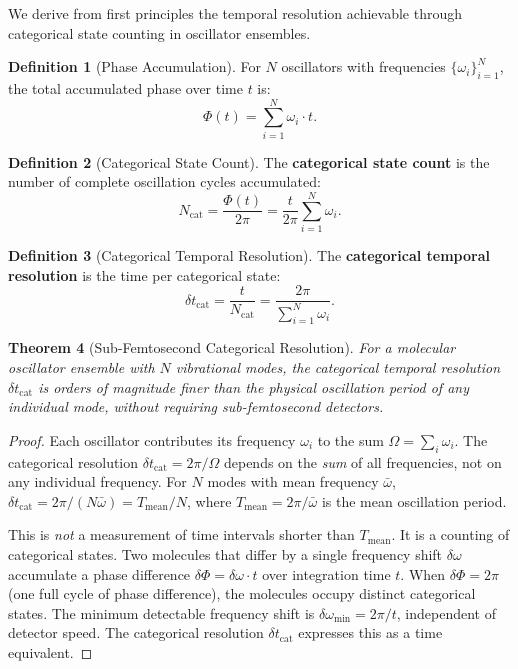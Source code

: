 \documentclass[11pt,a4paper]{article}
\newtheorem{theorem}{Theorem}[section]
\theoremstyle{definition}
\newtheorem{definition}[theorem]{Definition}
\theoremstyle{remark}
\begin{document}
We derive from first principles the temporal resolution achievable through categorical state counting in oscillator ensembles.

\begin{definition}[Phase Accumulation]
\label{def:phase}
For $N$ oscillators with frequencies $\{\omega_i\}_{i=1}^N$, the total accumulated phase over time $t$ is:
\begin{equation}
\Phi(t) = \sum_{i=1}^N \omega_i \cdot t.
\end{equation}
\end{definition}

\begin{definition}[Categorical State Count]
\label{def:ncat}
The \textbf{categorical state count} is the number of complete oscillation cycles accumulated:
\begin{equation}
N_{\mathrm{cat}} = \frac{\Phi(t)}{2\pi} = \frac{t}{2\pi} \sum_{i=1}^N \omega_i.
\end{equation}
\end{definition}

\begin{definition}[Categorical Temporal Resolution]
\label{def:dtcat}
The \textbf{categorical temporal resolution} is the time per categorical state:
\begin{equation}
\label{eq:dtcat}
\delta t_{\mathrm{cat}} = \frac{t}{N_{\mathrm{cat}}} = \frac{2\pi}{\sum_{i=1}^N \omega_i}.
\end{equation}
\end{definition}

\begin{theorem}[Sub-Femtosecond Categorical Resolution]
\label{thm:subfemto}
For a molecular oscillator ensemble with $N$ vibrational modes, the categorical temporal resolution $\delta t_{\mathrm{cat}}$ is orders of magnitude finer than the physical oscillation period of any individual mode, without requiring sub-femtosecond detectors.
\end{theorem}

\begin{proof}
Each oscillator contributes its frequency $\omega_i$ to the sum $\Omega = \sum_i \omega_i$. The categorical resolution $\delta t_{\mathrm{cat}} = 2\pi/\Omega$ depends on the \emph{sum} of all frequencies, not on any individual frequency. For $N$ modes with mean frequency $\bar{\omega}$, $\delta t_{\mathrm{cat}} = 2\pi/(N\bar{\omega}) = T_{\mathrm{mean}}/N$, where $T_{\mathrm{mean}} = 2\pi/\bar{\omega}$ is the mean oscillation period.

This is \emph{not} a measurement of time intervals shorter than $T_{\mathrm{mean}}$. It is a counting of categorical states. Two molecules that differ by a single frequency shift $\delta\omega$ accumulate a phase difference $\delta\Phi = \delta\omega \cdot t$ over integration time $t$. When $\delta\Phi = 2\pi$ (one full cycle of phase difference), the molecules occupy distinct categorical states. The minimum detectable frequency shift is $\delta\omega_{\min} = 2\pi/t$, independent of detector speed. The categorical resolution $\delta t_{\mathrm{cat}}$ expresses this as a time equivalent.
\end{proof}
\end{document}
